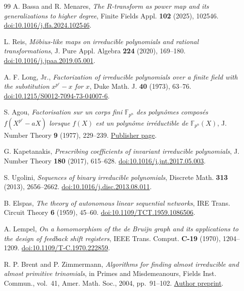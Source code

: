 \documentclass[11pt]{article}
\theoremstyle{definition}
\theoremstyle{remark}
\begin{document}
\begin{thebibliography}{99}
A. Bassa and R. Menares,
\emph{The $R$-transform as power map and its generalizations to higher degree},
Finite Fields Appl. \textbf{102} (2025), 102546.
\href{https://doi.org/10.1016/j.ffa.2024.102546}{doi:10.1016/j.ffa.2024.102546}.

L. Reis,
\emph{M\"obius-like maps on irreducible polynomials and rational transformations},
J. Pure Appl. Algebra \textbf{224} (2020), 169--180.
\href{https://doi.org/10.1016/j.jpaa.2019.05.001}{doi:10.1016/j.jpaa.2019.05.001}.

A. F. Long, Jr.,
\emph{Factorization of irreducible polynomials over a finite field with
the substitution $x^{p^r}-x$ for $x$},
Duke Math. J. \textbf{40} (1973), 63--76.
\href{https://doi.org/10.1215/S0012-7094-73-04007-6}{doi:10.1215/S0012-7094-73-04007-6}.

S. Agou,
\emph{Factorisation sur un corps fini $\mathbb F_{p^n}$ des
polyn\^omes compos\'es $f(X^{p^r}-aX)$ lorsque $f(X)$ est un
polyn\^ome irr\'eductible de $\mathbb F_{p^n}(X)$},
J. Number Theory \textbf{9} (1977), 229--239.
\href{https://www.sciencedirect.com/science/article/pii/0022314X77900270}{Publisher page}.

G. Kapetanakis,
\emph{Prescribing coefficients of invariant irreducible polynomials},
J. Number Theory \textbf{180} (2017), 615--628.
\href{https://doi.org/10.1016/j.jnt.2017.05.003}{doi:10.1016/j.jnt.2017.05.003}.

S. Ugolini,
\emph{Sequences of binary irreducible polynomials},
Discrete Math. \textbf{313} (2013), 2656--2662.
\href{https://doi.org/10.1016/j.disc.2013.08.011}{doi:10.1016/j.disc.2013.08.011}.

B. Elspas,
\emph{The theory of autonomous linear sequential networks},
IRE Trans. Circuit Theory \textbf{6} (1959), 45--60.
\href{https://doi.org/10.1109/TCT.1959.1086506}{doi:10.1109/TCT.1959.1086506}.

A. Lempel,
\emph{On a homomorphism of the de Bruijn graph and its applications
to the design of feedback shift registers},
IEEE Trans. Comput. \textbf{C-19} (1970), 1204--1209.
\href{https://doi.org/10.1109/T-C.1970.222859}{doi:10.1109/T-C.1970.222859}.

R. P. Brent and P. Zimmermann,
\emph{Algorithms for finding almost irreducible and almost primitive trinomials},
in Primes and Misdemeanours, Fields Inst. Commun., vol.~41,
Amer. Math. Soc., 2004, pp.~91--102.
\href{https://maths-people.anu.edu.au/~brent/pd/rpb212.pdf}{Author preprint}.


\end{thebibliography}
\end{document}
